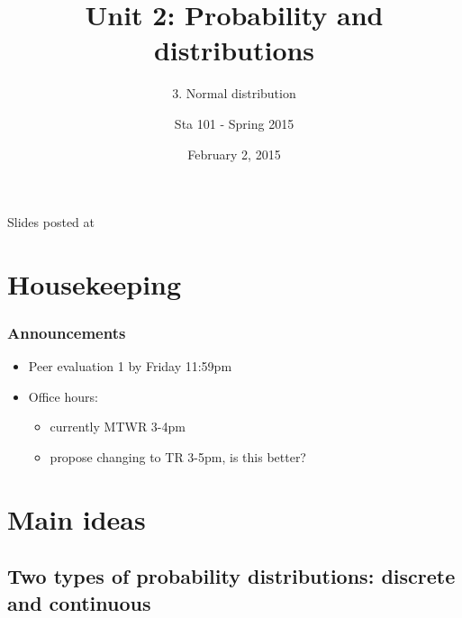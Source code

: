 \documentclass[11pt,containsverbatim,handout,xcolor=xelatex,dvipsnames,table]{beamer}
\title{Unit 2: Probability and distributions}
\subtitle{3. Normal distribution}
\author{Sta 101 - Spring 2015}
\date{February 2, 2015}
\institute{Duke University, Department of Statistical Science}
\begin{document}



\begin{frame}[plain]

\titlepage
\vfill
{\scriptsize {} \hfill Slides posted at  \webLink{\CourseSite}{\CourseSite}}
\addtocounter{framenumber}{-1} 

\end{frame}


\section{Housekeeping}


\begin{frame}
\frametitle{Announcements}

\begin{itemize}

\item Peer evaluation 1 by Friday 11:59pm

\item Office hours: 
\begin{itemize}
\item currently MTWR 3-4pm
\item propose changing to TR 3-5pm, is this better? \\
\end{itemize}


\end{itemize}

\end{frame}


\section{Main ideas}


\subsection{Two types of probability distributions: discrete and continuous}
\label{mi1}
\end{document}
